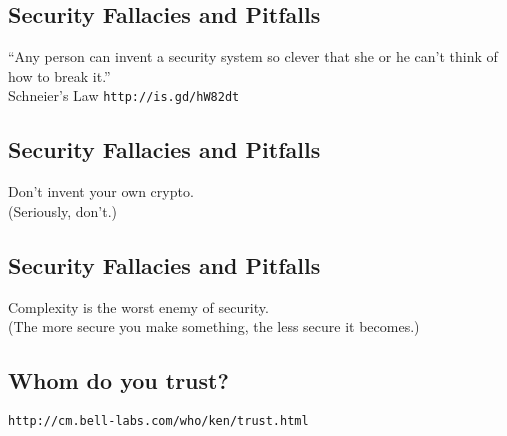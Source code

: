 \documentclass[xga]{xdvislides}
\begin{document}
\subsection{Security Fallacies and Pitfalls}
\vspace*{\fill}
\begin{center}
    \Hugesize
        ``Any person can invent a security system so clever that she or he
can't think of how to break it.'' \\
	\vspace{.25in}
	\Normalsize
	Schneier's Law \verb+http://is.gd/hW82dt+
\end{center}
\vspace*{\fill}

\subsection{Security Fallacies and Pitfalls}
\vspace*{\fill}
\begin{center}
    \Hugesize
        Don't invent your own crypto. \\
	\vspace{.25in}
	\Normalsize
	(Seriously, don't.)
\end{center}
\vspace*{\fill}

\subsection{Security Fallacies and Pitfalls}
\vspace*{\fill}
\begin{center}
    \Hugesize
	Complexity is the worst enemy of security. \\
	\vspace{.25in}
	\Normalsize
	(The more secure you make something, the less secure it becomes.)
\end{center}
\vspace*{\fill}

\subsection{Whom do you trust?}
\vspace*{\fill}
\begin{center}
	\verb+http://cm.bell-labs.com/who/ken/trust.html+
\end{center}
\vspace*{\fill}
\Normalsize
\end{document}
